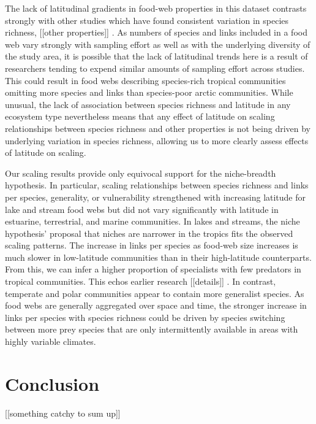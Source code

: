 \documentclass[12pt]{article}
\begin{document}
The lack of latitudinal gradients in food-web properties in this dataset contrasts
strongly with other studies which have found consistent variation in species richness,
[[other properties]] \citep{}. As numbers of species and links included in a food web
vary strongly with sampling effort as well as with the underlying diversity of the study
area, it is possible that the lack of latitudinal trends here is a result of researchers
tending to expend similar amounts of sampling effort across studies. This could result in
food webs describing species-rich tropical communities omitting more species and links
than species-poor arctic communities. While unusual, the lack of association between species richness
and latitude in any ecosystem type nevertheless means that any effect of latitude on scaling relationships
between species richness and other properties is not being driven by underlying variation in
species richness, allowing us to more clearly assess effects of latitude on scaling.


Our scaling results provide only equivocal support for the niche-breadth hypothesis.
In particular, scaling relationships between species richness and links per species,
generality, or vulnerability strengthened with increasing latitude for lake and stream
food webs but did not vary significantly with latitude in estuarine, terrestrial, and
marine communities. In lakes and streams, the niche hypothesis' proposal that niches
are narrower in the tropics fits the observed scaling patterns. The increase in links
per species as food-web size increases is much slower in low-latitude communities than
in their high-latitude counterparts. From this, we can infer a higher proportion of
specialists with few predators in tropical communities. This echos earlier research [[details]]
\citep{}. In contrast, temperate and polar communities appear to contain more generalist
species. As food webs are generally aggregated over space and time, the stronger
increase in links per species with species richness could be driven by species switching
between more prey species that are only intermittently available in areas with highly
variable climates.


\section*{Conclusion}

[[something catchy to sum up]]


\newpage
\end{document}
